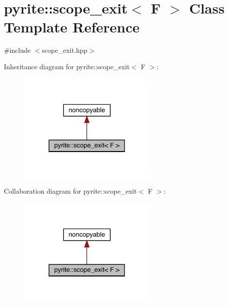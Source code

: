 \hypertarget{classpyrite_1_1scope__exit}{}\section{pyrite\+:\+:scope\+\_\+exit$<$ F $>$ Class Template Reference}
\label{classpyrite_1_1scope__exit}


{\ttfamily \#include $<$scope\+\_\+exit.\+hpp$>$}



Inheritance diagram for pyrite\+:\+:scope\+\_\+exit$<$ F $>$\+:
\nopagebreak
\begin{figure}[H]
\begin{center}
\leavevmode
\includegraphics[width=197pt]{dc/d46/classpyrite_1_1scope__exit__inherit__graph}
\end{center}
\end{figure}


Collaboration diagram for pyrite\+:\+:scope\+\_\+exit$<$ F $>$\+:
\nopagebreak
\begin{figure}[H]
\begin{center}
\leavevmode
\includegraphics[width=197pt]{d3/df8/classpyrite_1_1scope__exit__coll__graph}
\end{center}
\end{figure}
